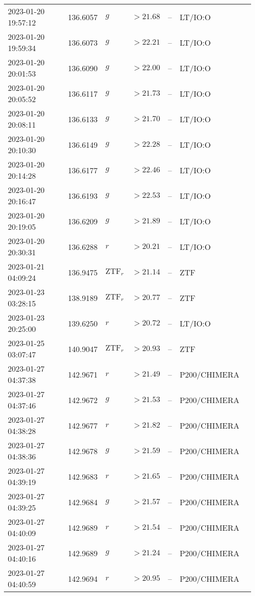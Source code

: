 \documentclass{nature_plusfigure}
\begin{document}
\begin{supplement}
\begin{center}
\begin{longtable}{lllllll}
2023-01-20 19:57:12 & 136.6057 & $g$ & $>21.68$ & -- & LT/IO:O &  \\ 
2023-01-20 19:59:34 & 136.6073 & $g$ & $>22.21$ & -- & LT/IO:O &  \\ 
2023-01-20 20:01:53 & 136.6090 & $g$ & $>22.00$ & -- & LT/IO:O &  \\ 
2023-01-20 20:05:52 & 136.6117 & $g$ & $>21.73$ & -- & LT/IO:O &  \\ 
2023-01-20 20:08:11 & 136.6133 & $g$ & $>21.70$ & -- & LT/IO:O &  \\ 
2023-01-20 20:10:30 & 136.6149 & $g$ & $>22.28$ & -- & LT/IO:O &  \\ 
2023-01-20 20:14:28 & 136.6177 & $g$ & $>22.46$ & -- & LT/IO:O &  \\ 
2023-01-20 20:16:47 & 136.6193 & $g$ & $>22.53$ & -- & LT/IO:O &  \\ 
2023-01-20 20:19:05 & 136.6209 & $g$ & $>21.89$ & -- & LT/IO:O &  \\ 
2023-01-20 20:30:31 & 136.6288 & $r$ & $>20.21$ & -- & LT/IO:O &  \\ 
2023-01-21 04:09:24 & 136.9475 & $\mathrm{ZTF}_{r}$ & $>21.14$ & -- & ZTF &  \\ 
2023-01-23 03:28:15 & 138.9189 & $\mathrm{ZTF}_{r}$ & $>20.77$ & -- & ZTF &  \\ 
2023-01-23 20:25:00 & 139.6250 & $r$ & $>20.72$ & -- & LT/IO:O &  \\ 
2023-01-25 03:07:47 & 140.9047 & $\mathrm{ZTF}_{r}$ & $>20.93$ & -- & ZTF &  \\ 
2023-01-27 04:37:38 & 142.9671 & $r$ & $>21.49$ & -- & P200/CHIMERA &  \\ 
2023-01-27 04:37:46 & 142.9672 & $g$ & $>21.53$ & -- & P200/CHIMERA &  \\ 
2023-01-27 04:38:28 & 142.9677 & $r$ & $>21.82$ & -- & P200/CHIMERA &  \\ 
2023-01-27 04:38:36 & 142.9678 & $g$ & $>21.59$ & -- & P200/CHIMERA &  \\ 
2023-01-27 04:39:19 & 142.9683 & $r$ & $>21.65$ & -- & P200/CHIMERA &  \\ 
2023-01-27 04:39:25 & 142.9684 & $g$ & $>21.57$ & -- & P200/CHIMERA &  \\ 
2023-01-27 04:40:09 & 142.9689 & $r$ & $>21.54$ & -- & P200/CHIMERA &  \\ 
2023-01-27 04:40:16 & 142.9689 & $g$ & $>21.24$ & -- & P200/CHIMERA &  \\ 
2023-01-27 04:40:59 & 142.9694 & $r$ & $>20.95$ & -- & P200/CHIMERA &  \\ 

\end{longtable}
\end{center}
\end{supplement}
\end{document}
